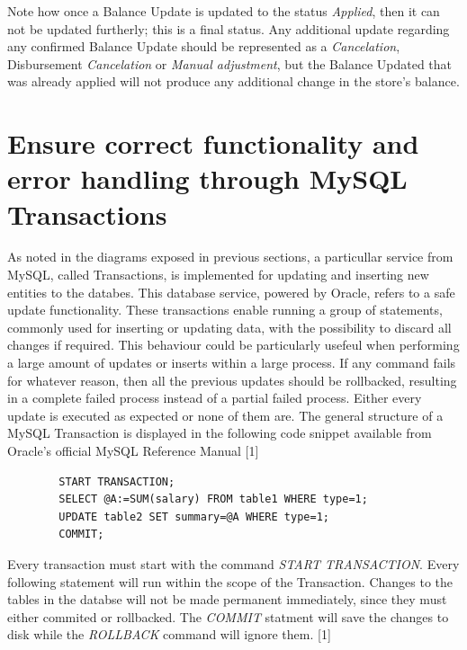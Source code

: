 Note how once a Balance Update is updated to the status \textit{Applied}, then it can not be updated furtherly; this is a final status. Any additional update regarding any confirmed Balance Update should be represented as a \textit{Cancelation}, Disbursement \textit{Cancelation} or \textit{Manual adjustment}, but the Balance Updated that was already applied will not produce any additional change in the store's balance.


\section{Ensure correct functionality and error handling through MySQL Transactions}

As noted in the diagrams exposed in previous sections, a particullar service from MySQL, called Transactions, is implemented for updating and inserting new entities to the databes. This database service, powered by Oracle, refers to a safe update functionality. These transactions enable running a group of statements, commonly used for inserting or updating data, with the possibility to discard all changes if required. This behaviour could be particularly usefeul when performing a large amount of updates or inserts within a large process. If any command fails for whatever reason, then all the previous updates should be rollbacked, resulting in a complete failed process instead of a partial failed process. Either every update is executed as expected or none of them are. The general structure of a MySQL Transaction is displayed in the following code snippet available from Oracle's official MySQL Reference Manual [1]

\begin{center}
    \begin{verbatim}
        START TRANSACTION;
        SELECT @A:=SUM(salary) FROM table1 WHERE type=1;
        UPDATE table2 SET summary=@A WHERE type=1;
        COMMIT;
    \end{verbatim}
\end{center}

Every transaction must start with the command \textit{START TRANSACTION}. Every following statement will run within the scope of the Transaction. Changes to the tables in the databse will not be made permanent immediately, since they must either commited or rollbacked. The \textit{COMMIT} statment will save the changes to disk while the \textit{ROLLBACK} command will ignore them. [1]\\

